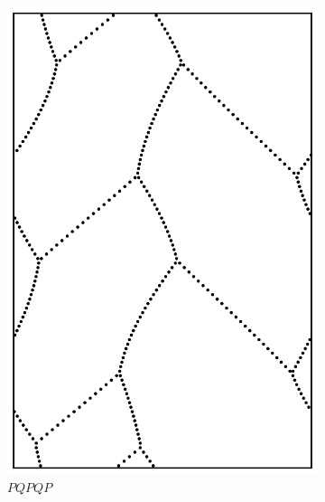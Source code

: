 \documentclass[12pt,twoside]{reedthesis}
\theoremstyle{definition}
\begin{document}
\begin{figure}[h]
\begin{subfigure}[t]{0.24\textwidth}
    \includegraphics[width=\textwidth]{figures/string_cheese_appendix/pqpqp.pdf}
    \caption*{$PQPQP$}
    \vspace{5mm}
  \end{subfigure}
  \hfill
  \begin{subfigure}[t]{0.24\textwidth}

\end{subfigure}
\end{figure}
\end{document}
